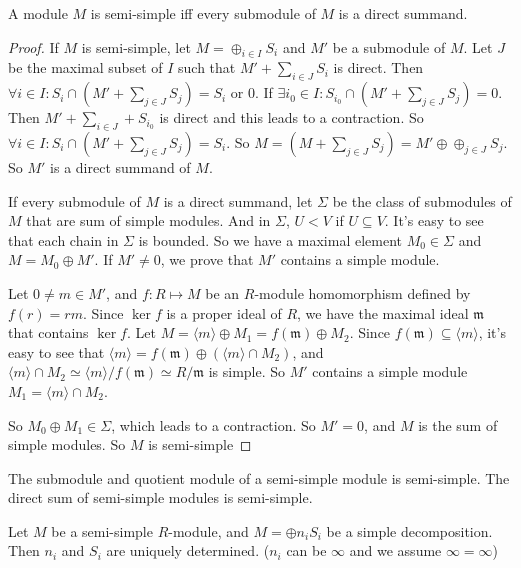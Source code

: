 \documentclass[12pt]{book}
\begin{document}
	\begin{theorem}
		A module $M$ is semi-simple iff every submodule of $M$ is a direct summand.
	\end{theorem}
	\begin{proof}
		If $M$ is semi-simple, let $M=\oplus_{i\in I} S_i$ and $M'$ be a submodule of $M$. Let $J$ be the maximal subset of $I$ such that $M'+\sum_{i\in J} S_i$ is direct. Then $\forall i\in I: S_i\cap (M'+\sum_{j\in J} S_j) =S_i$ or 0. If $\exists i_0\in I: S_{i_0}\cap (M'+\sum_{j\in J} S_j)=0$. Then $M'+\sum_{i\in J} +S_{i_0}$ is direct and this leads to a contraction. So $\forall i\in I: S_i\cap (M'+\sum_{j\in J} S_j) =S_i$. So $M=(M+\sum_{j\in J} S_j)=M'\oplus\oplus_{j\in J} S_j$. So $M'$ is a direct summand of $M$.
	
		If every submodule of $M$ is a direct summand, let $\Sigma$ be the class of submodules of $M$ that are sum of simple modules. And in $\Sigma$, $U<V$ if $U\subseteq V$. It's easy to see that each chain in $\Sigma$ is bounded. So we have a maximal element $M_0\in\Sigma$ and $M=M_0\oplus M'$. If $M'\neq 0$, we prove that $M'$ contains a simple module.
		
		Let $0\neq m\in M'$, and $f:R\mapsto M$ be an $R$-module homomorphism defined by $f(r)=rm$. Since $\ker f$ is a proper ideal of $R$, we have the maximal ideal $\mathfrak m$ that contains $\ker f$. Let $M=\langle m\rangle\oplus M_1=f(\mathfrak m)\oplus M_2$. Since $f(\mathfrak m)\subseteq\langle m\rangle$, it's easy to see that $\langle m\rangle=f(\mathfrak m)\oplus (\langle m\rangle\cap M_2)$, and $\langle m\rangle\cap M_2\simeq \langle m\rangle/f(\mathfrak m)\simeq R/\mathfrak m$ is simple. So $M'$ contains a simple module $M_1=\langle m\rangle\cap M_2$.
		
		So $M_0\oplus M_1\in \Sigma$, which leads to a contraction. So $M'=0$, and $M$ is the sum of simple modules. So $M$ is semi-simple
	\end{proof}
	
	\begin{theorem}
		The submodule and quotient module of a semi-simple module is semi-simple. The direct sum of semi-simple modules is semi-simple.
	\end{theorem}
	
	\begin{theorem}
		Let $M$ be a semi-simple $R$-module, and $M=\oplus n_iS_i$ be a simple decomposition. Then $n_i$ and $S_i$ are uniquely determined. ($n_i$ can be $\infty$ and we assume $\infty=\infty$)
	\end{theorem}
	
\end{document}
